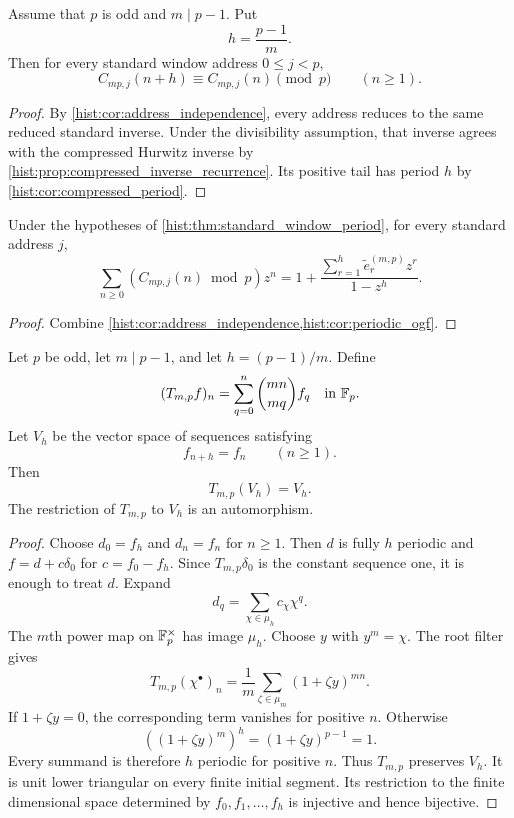 \begin{histtheorem}\label{hist:thm:standard_window_period}
Assume that \(p\) is odd and \(m\mid p-1\). Put
\[
h=\frac{p-1}{m}.
\]
Then for every standard window address \(0\leq j<p\),
\[
\boxed{
C_{mp,j}(n+h)
\equiv
C_{mp,j}(n)
\pmod p
\qquad(n\geq1).
}
\]
\end{histtheorem}

\begin{proof}
By \cref{hist:cor:address_independence}, every address reduces to the same reduced standard inverse. Under the divisibility assumption, that inverse agrees with the compressed Hurwitz inverse by \cref{hist:prop:compressed_inverse_recurrence}. Its positive tail has period \(h\) by \cref{hist:cor:compressed_period}.
\end{proof}

\begin{histcorollary}\label{hist:cor:standard_rational_ogf}
Under the hypotheses of \cref{hist:thm:standard_window_period}, for every standard address \(j\),
\[
\sum_{n\geq0}
\left(C_{mp,j}(n)\bmod p\right)z^n
=
1+
\frac{
\sum_{r=1}^{h}\widetilde e_r^{(m,p)}z^r
}{1-z^h}.
\]
\end{histcorollary}

\begin{proof}
Combine \cref{hist:cor:address_independence,hist:cor:periodic_ogf}.
\end{proof}


\begin{histtheorem}\label{hist:thm:standard_window_fourier}
Let \(p\) be odd, let \(m\mid p-1\), and let \(h=(p-1)/m\). Define
\[
(T_{m,p}f)_n
=
\sum_{q=0}^{n}\binom{mn}{mq}f_q
\quad\text{in }\mathbb F_p.
\]
Let \(V_h\) be the vector space of sequences satisfying
\[
f_{n+h}=f_n
\qquad(n\geq1).
\]
Then
\[
\boxed{T_{m,p}(V_h)=V_h.}
\]
The restriction of \(T_{m,p}\) to \(V_h\) is an automorphism.
\end{histtheorem}

\begin{proof}
Choose \(d_0=f_h\) and \(d_n=f_n\) for \(n\geq1\). Then \(d\) is fully \(h\) periodic and \(f=d+c\delta_0\) for \(c=f_0-f_h\). Since \(T_{m,p}\delta_0\) is the constant sequence one, it is enough to treat \(d\). Expand
\[
d_q=\sum_{\chi\in\mu_h}c_\chi\chi^q.
\]
The \(m\)th power map on \(\mathbb F_p^\times\) has image \(\mu_h\). Choose \(y\) with \(y^m=\chi\). The root filter gives
\[
T_{m,p}(\chi^\bullet)_n
=
\frac1m
\sum_{\zeta\in\mu_m}
(1+\zeta y)^{mn}.
\]
If \(1+\zeta y=0\), the corresponding term vanishes for positive \(n\). Otherwise
\[
\left((1+\zeta y)^m\right)^h
=
(1+\zeta y)^{p-1}
=1.
\]
Every summand is therefore \(h\) periodic for positive \(n\). Thus \(T_{m,p}\) preserves \(V_h\). It is unit lower triangular on every finite initial segment. Its restriction to the finite dimensional space determined by \(f_0,f_1,\ldots,f_h\) is injective and hence bijective.
\end{proof}

